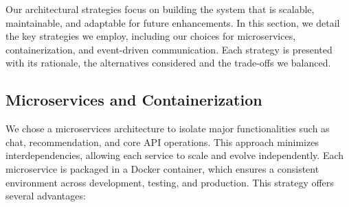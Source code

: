 \documentclass{FastFyp}
\begin{document}
Our architectural strategies focus on building the system that is scalable, maintainable, and adaptable for future enhancements. In this section, we detail the key strategies we employ, including our choices for microservices, containerization, and event-driven communication. Each strategy is presented with its rationale, the alternatives considered and the trade-offs we balanced.
\subsection{Microservices and Containerization} 
We chose a microservices architecture to isolate major functionalities such as chat, recommendation, and core API operations. This approach minimizes interdependencies, allowing each service to scale and evolve independently. Each microservice is packaged in a Docker container, which ensures a consistent environment across development, testing, and production. This strategy offers several advantages:
\end{document}
